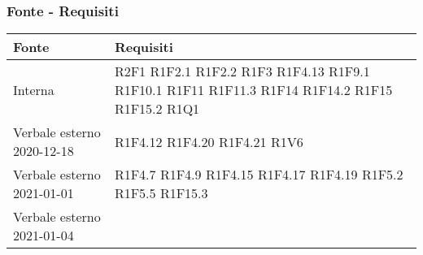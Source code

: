 \subsubsection{Fonte - Requisiti}
\begin{center}
	\begin{longtable}{|p{44mm}|p{22mm}|}
		\hline
		\rowcolor{lighter-grayer}
		\textbf{Fonte} &  \textbf{Requisiti}  \\
		\hline
		\endhead
		
		
		
		 Interna & 
		 R2F1 \newline
		 	R1F2.1 \newline
		 	R1F2.2 \newline
			R1F3 \newline 	 
			R1F4.13 \newline
			R1F9.1 \newline
			R1F10.1 \newline
			R1F11 \newline
			R1F11.3 \newline
			R1F14 \newline
			R1F14.2 \newline
			R1F15 \newline
			R1F15.2 \newline
			R1Q1
	    \\
		\hline
		Verbale esterno 2020-12-18 & 
		
			R1F4.12 \newline
			R1F4.20 \newline
			R1F4.21 \newline
			R1V6
	\\
	\hline
	Verbale esterno 2021-01-01 & 
		R1F4.7 \newline
		R1F4.9 \newline
		R1F4.15 \newline
		R1F4.17 \newline
		R1F4.19 \newline
		R1F5.2 \newline
		R1F5.5 \newline
		R1F15.3
\\
\hline
Verbale esterno 2021-01-04 & 


\end{longtable}
\end{center}
